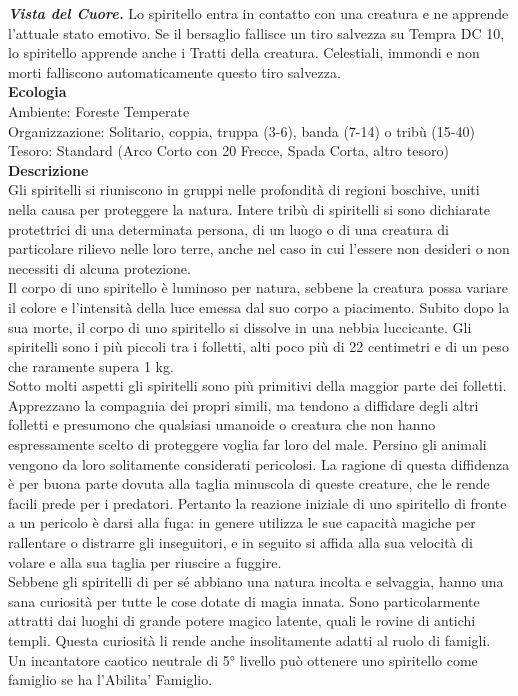 \begin{multicols}{2}
\emph{\textbf{Vista del Cuore.}} Lo spiritello entra in contatto con una creatura e ne apprende l'attuale stato emotivo. Se il bersaglio fallisce un tiro salvezza su Tempra DC 10, lo spiritello apprende anche i Tratti della creatura. Celestiali, immondi e non morti falliscono automaticamente questo tiro salvezza.\\
\textbf{Ecologia}\\
Ambiente: Foreste Temperate\\
Organizzazione: Solitario, coppia, truppa (3-6), banda (7-14) o tribù (15-40)\\
Tesoro: Standard (Arco Corto con 20 Frecce, Spada Corta, altro tesoro)\\
\textbf{Descrizione}\\
Gli spiritelli si riuniscono in gruppi nelle profondità di regioni boschive, uniti nella causa per proteggere la natura. Intere tribù di spiritelli si sono dichiarate protettrici di una determinata persona, di un luogo o di una creatura di particolare rilievo nelle loro terre, anche nel caso in cui l'essere non desideri o non necessiti di alcuna protezione.\\

Il corpo di uno spiritello è luminoso per natura, sebbene la creatura possa variare il colore e l'intensità della luce emessa dal suo corpo a piacimento. Subito dopo la sua morte, il corpo di uno spiritello si dissolve in una nebbia luccicante. Gli spiritelli sono i più piccoli tra i folletti, alti poco più di 22 centimetri e di un peso che raramente supera 1 kg.\\

Sotto molti aspetti gli spiritelli sono più primitivi della maggior parte dei folletti. Apprezzano la compagnia dei propri simili, ma tendono a diffidare degli altri folletti e presumono che qualsiasi umanoide o creatura che non hanno espressamente scelto di proteggere voglia far loro del male. Persino gli animali vengono da loro solitamente considerati pericolosi. La ragione di questa diffidenza è per buona parte dovuta alla taglia minuscola di queste creature, che le rende facili prede per i predatori. Pertanto la reazione iniziale di uno spiritello di fronte a un pericolo è darsi alla fuga: in genere utilizza le sue capacità magiche per rallentare o distrarre gli inseguitori, e in seguito si affida alla sua velocità di volare e alla sua taglia per riuscire a fuggire.\\

Sebbene gli spiritelli di per sé abbiano una natura incolta e selvaggia, hanno una sana curiosità per tutte le cose dotate di magia innata. Sono particolarmente attratti dai luoghi di grande potere magico latente, quali le rovine di antichi templi. Questa curiosità li rende anche insolitamente adatti al ruolo di famigli. Un incantatore caotico neutrale di 5° livello può ottenere uno spiritello come famiglio se ha l'Abilita' Famiglio.\\


\end{multicols}
